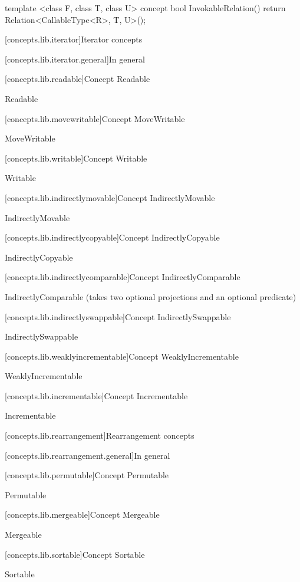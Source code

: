 \begin{addedblock}
\begin{itemdecl}
template <class F, class T, class U>
concept bool InvokableRelation() {
  return Relation<CallableType<R>, T, U>();
}
\end{itemdecl}

[concepts.lib.iterator]{Iterator concepts}

[concepts.lib.iterator.general]{In general}

\pnum
{}

[concepts.lib.readable]{Concept Readable}

\pnum
Readable

[concepts.lib.movewritable]{Concept MoveWritable}

\pnum
MoveWritable

[concepts.lib.writable]{Concept Writable}

\pnum
Writable

[concepts.lib.indirectlymovable]{Concept IndirectlyMovable}

\pnum
IndirectlyMovable

[concepts.lib.indirectlycopyable]{Concept IndirectlyCopyable}

\pnum
IndirectlyCopyable

[concepts.lib.indirectlycomparable]{Concept IndirectlyComparable}

\pnum
IndirectlyComparable (takes two optional projections and an optional predicate)

[concepts.lib.indirectlyswappable]{Concept IndirectlySwappable}

\pnum
IndirectlySwappable

[concepts.lib.weaklyincrementable]{Concept WeaklyIncrementable}

\pnum
WeaklyIncrementable

[concepts.lib.incrementable]{Concept Incrementable}

\pnum
Incrementable

[concepts.lib.rearrangement]{Rearrangement concepts}

[concepts.lib.rearrangement.general]{In general}

\pnum
{}

[concepts.lib.permutable]{Concept Permutable}

\pnum
Permutable

[concepts.lib.mergeable]{Concept Mergeable}

\pnum
Mergeable

[concepts.lib.sortable]{Concept Sortable}

\pnum
Sortable

\end{addedblock}
